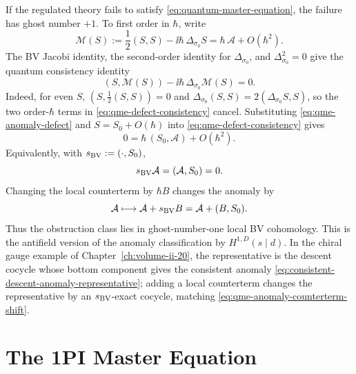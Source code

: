 If the regulated theory fails to satisfy \eqref{eq:quantum-master-equation},
the failure has ghost number \(+1\).  To first order in \(\hbar\), write
\begin{equation}
  \mathcal M(S)
  :=
  \frac12(S,S)-\ii\hbar\,\Delta_{\sigma_0}S
  =
  \hbar\,\mathcal A+O(\hbar^2).
  \label{eq:qme-anomaly-defect}
\end{equation}
The BV Jacobi identity, the second-order identity for \(\Delta_{\sigma_0}\),
and \(\Delta_{\sigma_0}^2=0\) give the quantum consistency identity
\begin{equation}
  (S,\mathcal M(S))-\ii\hbar\,\Delta_{\sigma_0}\mathcal M(S)=0.
  \label{eq:qme-defect-consistency}
\end{equation}
Indeed, for even \(S\), \((S,\frac12(S,S))=0\) and
\(\Delta_{\sigma_0}(S,S)=2(\Delta_{\sigma_0}S,S)\), so the two order-\(\hbar\)
terms in \eqref{eq:qme-defect-consistency} cancel.  Substituting
\eqref{eq:qme-anomaly-defect} and \(S=S_0+O(\hbar)\) into
\eqref{eq:qme-defect-consistency} gives
\[
  0
  =
  \hbar\,(S_0,\mathcal A)+O(\hbar^2).
\]
Equivalently, with \(s_{\rm BV}:=(\cdot,S_0)\),
\[
  s_{\rm BV}\mathcal A=(\mathcal A,S_0)=0 .
\]
Changing the local counterterm by \(\hbar B\) changes the anomaly by
\begin{equation}
  \mathcal A\longmapsto \mathcal A+s_{\rm BV}B
  =
  \mathcal A+(B,S_0) .
  \label{eq:qme-anomaly-counterterm-shift}
\end{equation}
Thus the obstruction class lies in ghost-number-one local BV cohomology.  This
is the antifield version of the anomaly classification by
\(H^{1,D}(s\mid d)\).  In the chiral gauge example of
Chapter~\ref{ch:volume-ii-20}, the representative is the
descent cocycle whose bottom component gives the consistent anomaly
\eqref{eq:consistent-descent-anomaly-representative}; adding a local
counterterm changes the representative by an \(s_{\rm BV}\)-exact cocycle,
matching \eqref{eq:qme-anomaly-counterterm-shift}.

\section{The 1PI Master Equation}

